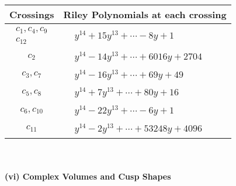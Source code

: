 \documentclass[1p]{elsarticle_modified}
\theoremstyle{definition}
\begin{document}
\begin{tabular}{m{50pt}|m{274pt}}
Crossings & \hspace{64pt}Riley Polynomials at each crossing \\
\hline $$\begin{aligned}c_{1},c_{4},c_{9}\\c_{12}\end{aligned}$$&$\begin{aligned}
&y^{14}+15 y^{13}+\cdots-8 y+1
\end{aligned}$\\
\hline $$\begin{aligned}c_{2}\end{aligned}$$&$\begin{aligned}
&y^{14}-14 y^{13}+\cdots+6016 y+2704
\end{aligned}$\\
\hline $$\begin{aligned}c_{3},c_{7}\end{aligned}$$&$\begin{aligned}
&y^{14}-16 y^{13}+\cdots+69 y+49
\end{aligned}$\\
\hline $$\begin{aligned}c_{5},c_{8}\end{aligned}$$&$\begin{aligned}
&y^{14}+7 y^{13}+\cdots+80 y+16
\end{aligned}$\\
\hline $$\begin{aligned}c_{6},c_{10}\end{aligned}$$&$\begin{aligned}
&y^{14}-22 y^{13}+\cdots-6 y+1
\end{aligned}$\\
\hline $$\begin{aligned}c_{11}\end{aligned}$$&$\begin{aligned}
&y^{14}-2 y^{13}+\cdots+53248 y+4096
\end{aligned}$\\
\hline
\end{tabular}\\~\\
\newpage\flushleft \textbf{(vi) Complex Volumes and Cusp Shapes}
\end{document}
